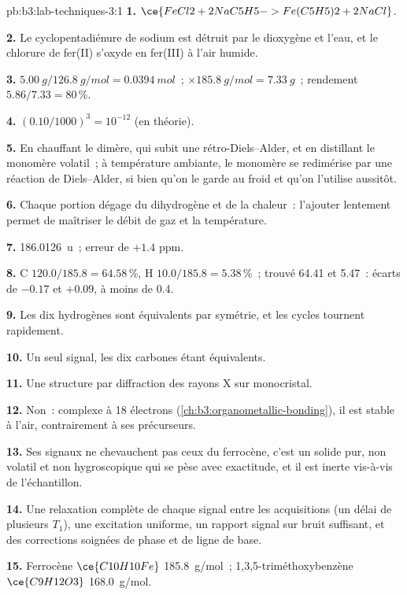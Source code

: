 \begin{solution}{pb:b3:lab-techniques-3:1}
\textbf{1.} $\ce{FeCl2 + 2NaC5H5 -> Fe(C5H5)2 + 2NaCl}$.

\textbf{2.} Le cyclopentadiénure de sodium est détruit par le dioxygène et
l'eau, et le chlorure de fer(II) s'oxyde en fer(III) à l'air humide.

\textbf{3.} $\qty{5.00}{g}/\qty{126.8}{g/mol} = \qty{0.0394}{mol}$~; $\times \qty{185.8}{g/mol} = \qty{7.33}{g}$~; rendement $5.86/7.33 = 80$\,\%.

\textbf{4.} $(0.10/1000)^3 = 10^{-12}$ (en théorie).

\textbf{5.} En chauffant le dimère, qui subit une rétro-Diels--Alder, et en
distillant le monomère volatil~; à température ambiante, le monomère se
redimérise par une réaction de Diels--Alder, si bien qu'on le garde au
froid et qu'on l'utilise aussitôt.

\textbf{6.} Chaque portion dégage du dihydrogène et de la chaleur~:
l'ajouter lentement permet de maîtriser le débit de gaz et la température.

\textbf{7.} \qty{186.0126}{u}~; erreur de $+1.4$ ppm.

\textbf{8.} C $120.0/185.8 = 64.58$\,\%, H $10.0/185.8 = 5.38$\,\%~; trouvé 64.41 et 5.47~: écarts de $-0.17$ et $+0.09$, à moins de 0.4.

\textbf{9.} Les dix hydrogènes sont équivalents par symétrie, et les cycles tournent rapidement.

\textbf{10.} Un seul signal, les dix carbones étant équivalents.

\textbf{11.} Une structure par diffraction des rayons X sur monocristal.

\textbf{12.} Non~: complexe à 18 électrons (\cref{ch:b3:organometallic-bonding}), il est stable à l'air, contrairement à ses
précurseurs.

\textbf{13.} Ses signaux ne chevauchent pas ceux du ferrocène, c'est un
solide pur, non volatil et non hygroscopique qui se pèse avec exactitude,
et il est inerte vis-à-vis de l'échantillon.

\textbf{14.} Une relaxation complète de chaque signal entre les acquisitions (un délai de plusieurs $T_1$),
une excitation uniforme, un rapport signal sur bruit suffisant, et des
corrections soignées de phase et de ligne de base.

\textbf{15.} Ferrocène $\ce{C10H10Fe}$ \qty{185.8}{g/mol}~; 1,3,5-triméthoxybenzène $\ce{C9H12O3}$ \qty{168.0}{g/mol}.


\end{solution}
